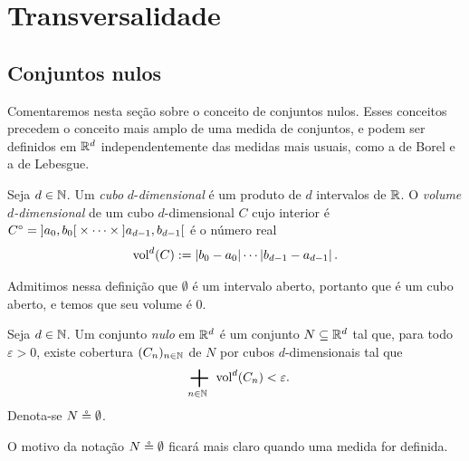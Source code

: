 \section{Transversalidade}

\subsection{Conjuntos nulos}

Comentaremos nesta seção sobre o conceito de conjuntos nulos. Esses conceitos precedem o conceito mais amplo de uma medida de conjuntos, e podem ser definidos em $\mathbb{R}^d$ independentemente das medidas mais usuais, como a de Borel e a de Lebesgue.

\begin{definition}
Seja $d \in \mathbb{N}$. Um \emph{cubo} $d$-\emph{dimensional} é um produto de $d$ intervalos de $\mathbb{R}$. O \emph{volume $d$-dimensional} de um cubo $d$-dimensional $C$ cujo interior é ${C}^\circ = \left]a_0,\allowbreak b_0\right[ \times \cdots \times \left]a_{d-1},\allowbreak b_{d-1}\right[$ é o número real
	\begin{equation*}
	\operatorname{vol}^d(C) := \left\vert{b_0 - a_0}\right\vert\cdots\left\vert{b_{d-1} - a_{d-1}}\right\vert.
	\end{equation*}
\end{definition}

Admitimos nessa definição que $\emptyset$ é um intervalo aberto, portanto que é um cubo aberto, e temos que seu volume é $0$.

\begin{definition}
Seja $d \in \mathbb{N}$. Um conjunto \emph{nulo} em $\mathbb{R}^d$ é um conjunto $N \subseteq \mathbb{R}^d$ tal que, para todo $\varepsilon>0$, existe cobertura $(C_n)_{n \in \mathbb{N}}$ de $N$ por cubos $d$-dimensionais tal que
	\begin{equation*}
	\sum_{n \in \N} \vol^d(C_n) < \varepsilon.
	\end{equation*}
Denota-se $N \circeq \emptyset$.
\end{definition}

O motivo da notação $N \circeq \emptyset$ ficará mais claro quando uma medida for definida.

